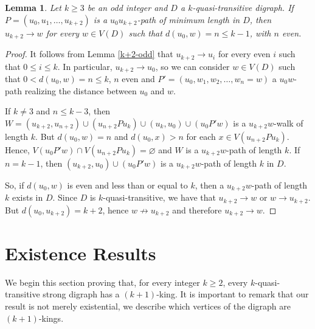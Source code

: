 \documentclass[preprint]{elsarticle}
\newtheorem{lem}[thm]{Lemma}
\begin{document}
\begin{lem} \label{dom-k+2-odd}
Let $k \ge 3$ be an odd integer and $D$ a $k$-quasi-transitive digraph.   If $P = (u_0, u_1, \dots, u_{k+2})$ is a $u_0 u_{k+2}$-path of minimum length in $D$, then $u_{k+2} \to w$ for every $w \in V(D)$ such that $d(u_0, w) = n \le k-1$, with $n$ even.
\end{lem}

\begin{proof}
It follows from Lemma \ref{k+2-odd} that $u_{k+2} \to u_i$ for every even $i$ such that $0 \le i \le k$.   In particular, $u_{k+2} \to u_0$, so we can consider $w \in V(D)$ such that $0 < d(u_0, w) = n \le k$, $n$ even and $P' = (u_0, w_1, w_2, \dots, w_n = w)$ a $u_0 w$-path realizing the distance between $u_0$ and $w$.

If $k \ne 3$ and $n \le k-3$, then $W = (u_{k+2}, u_{n+2}) \cup (u_{n+2} P u_k) \cup (u_k, u_0) \cup (u_0 P' w)$ is a $u_{k+2} w$-walk of length $k$.   But $d(u_0, w) = n$ and $d(u_0, x) > n$ for each $x \in V(u_{n+2} P u_k)$.   Hence, $V(u_0 P' w) \cap V(u_{n+2} P u_k) = \varnothing$ and $W$ is a $u_{k+2} w$-path of length $k$.   If $n = k-1$, then $(u_{k+2}, u_0) \cup (u_0 P' w)$ is a $u_{k+2} w$-path of length $k$ in $D$.

So, if $d(u_0, w)$ is even and less than or equal to $k$, then a $u_{k+2} w$-path of length $k$ exists in $D$.   Since $D$ is $k$-quasi-transitive, we have that $u_{k+2} \to w$ or $w \to u_{k+2}$.   But $d(u_0, u_{k+2}) = k+2$, hence $w \not \to u_{k+2}$ and therefore $u_{k+2} \to w$.
\end{proof}






























\section{Existence Results} \label{exist}

We begin this section proving that, for every integer $k \ge 2$, every $k$-quasi-transitive strong digraph has a $(k+1)$-king.   It is important to remark that our result is not merely existential, we describe which vertices of the digraph are $(k+1)$-kings.
\end{document}
